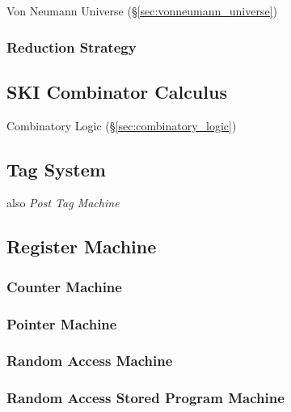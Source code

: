 Von Neumann Universe (\S\ref{sec:vonneumann_universe})



\subsubsection{Reduction Strategy}\label{sec:reduction_strategy}



\subsection{SKI Combinator Calculus}\label{sec:ski_calculus}

Combinatory Logic (\S\ref{sec:combinatory_logic})



\subsection{Tag System}\label{sec:tag_system}

also \emph{Post Tag Machine}



\subsection{Register Machine}\label{sec:register_machine}

\subsubsection{Counter Machine}

\subsubsection{Pointer Machine}

\subsubsection{Random Access Machine}

\subsubsection{Random Access Stored Program Machine}



